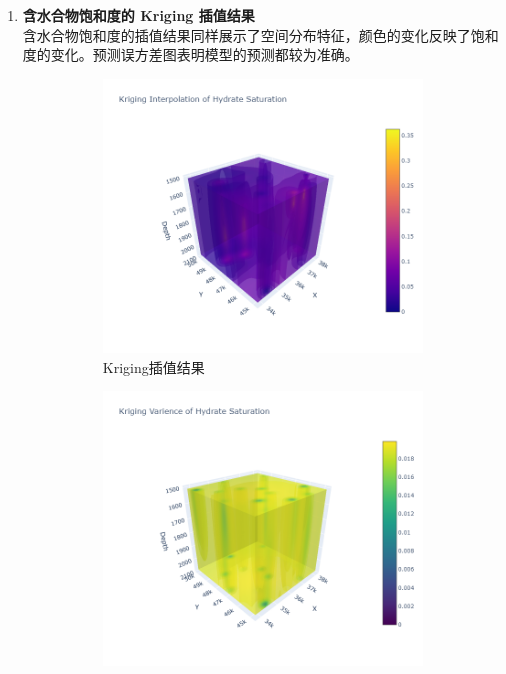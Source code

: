 \documentclass[12pt,a4paper]{nmmcm}
\begin{document}
\begin{enumerate}
  \item \textbf{含水合物饱和度的 Kriging 插值结果} \\
        含水合物饱和度的插值结果同样展示了空间分布特征，颜色的变化反映了饱和度的变化。预测误方差图表明模型的预测都较为准确。
        \begin{figure}[H]
          \begin{subfigure}[b]{0.3\textwidth}
            \centering
            \includegraphics[width=\textwidth]{figures/task2/task2-6-1.png}
            \caption{Kriging插值结果}
            \label{fig:water-saturation-Kriging-3d}
          \end{subfigure}
          \hfill
          \begin{subfigure}[b]{0.3\textwidth}
            \centering
            \includegraphics[width=\textwidth]{figures/task2/task2-6-2.png}

\end{subfigure}
\end{figure}
\end{enumerate}
\end{document}
